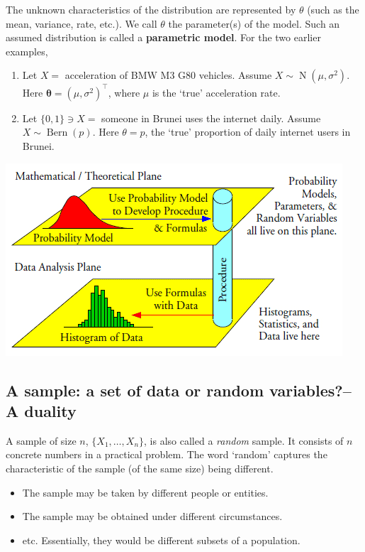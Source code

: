 \documentclass[
]{book}
\providecommand{\tightlist}{%
  \setlength{\itemsep}{0pt}\setlength{\parskip}{0pt}}
\newcommand{\btheta}{{\boldsymbol\theta}}
\DeclareMathOperator{\N}{N}
\DeclareMathOperator{\Bern}{Bern}
\theoremstyle{definition}
\theoremstyle{definition}
\theoremstyle{definition}
\theoremstyle{definition}
\theoremstyle{remark}
\begin{document}
The unknown characteristics of the distribution are represented by \(\theta\) (such as the mean, variance, rate, etc.).
We call \(\theta\) the parameter(s) of the model.
Such an assumed distribution is called a \textbf{parametric model}.
For the two earlier examples,

\begin{enumerate}
\def\labelenumi{\arabic{enumi}.}
\item
  Let \(X =\) acceleration of BMW M3 G80 vehicles. Assume \(X\sim\N(\mu,\sigma^2)\). Here \(\btheta = (\mu,\sigma^2)^\top\), where \(\mu\) is the `true' acceleration rate.
\item
  Let \(\{0,1\} \ni X =\) someone in Brunei uses the internet daily. Assume \(X\sim\Bern(p)\). Here \(\theta = p\), the `true' proportion of daily internet users in Brunei.
\end{enumerate}

\begin{center}\includegraphics[width=0.8\linewidth]{figure/00-theoreticaldataplane} \end{center}

\hypertarget{a-sample-a-set-of-data-or-random-variablesa-duality}{%
\subsection*{A sample: a set of data or random variables?--A duality}\label{a-sample-a-set-of-data-or-random-variablesa-duality}}

A sample of size \(n\), \(\{X_1,\dots,X_n\}\), is also called a \emph{random} sample. It consists of \(n\) concrete numbers in a practical problem.
The word `random' captures the characteristic of the sample (of the same
size) being different.

\begin{itemize}
\tightlist
\item
  The sample may be taken by different people or entities.
\item
  The sample may be obtained under different circumstances.
\item
  etc.
  Essentially, they would be different subsets of a population.
\end{itemize}
\end{document}
